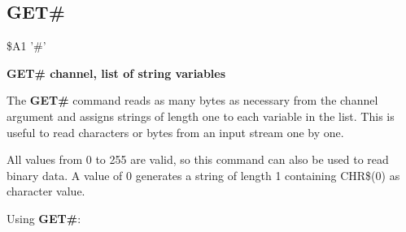 \subsection{GET\#}
\begin{description}[leftmargin=3cm,style=nextline]
\item [Token:] \$A1 '\#'
\item [Format:] {\bf GET\# channel, list of string variables}
\item [Usage:] The {\bf GET\#} command reads as many bytes
               as necessary from the channel argument
               and assigns strings of length one to
               each variable in the list.
               This is useful to read characters or bytes from
               an input stream one by one.

\item [Remarks:] All values from 0 to 255 are valid, so this
               command can also be used to read binary data.
               A value of 0 generates a string of length 1
               containing CHR\$(0) as character value.

\item [Example:] Using {\bf GET\#}:
\end{description}


\newpage
